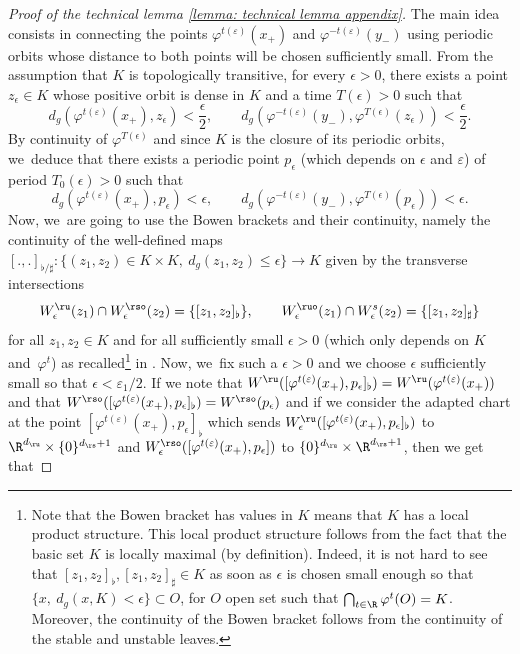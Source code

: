 \begin{appendix}
\begin{proof}[Proof of the technical lemma \ref{lemma: technical lemma appendix}]
The main idea consists in connecting the points $\varphi^{ t (\varepsilon)} (x_+)$ and $\varphi^{ - t (\varepsilon)} (y_-)$ using periodic orbits whose distance to both points will be chosen sufficiently small. From the assumption that $K$ is topologically transitive, for every $\epsilon > 0$, there exists a point $z_{\epsilon} \in K$ whose positive orbit is dense in $K$ and a time $T (\epsilon) > 0$ such that
\[
d_g (\varphi^{ t (\varepsilon)} (x_+), z_{\epsilon}) < \frac{\epsilon}{2}, \qquad d_g (\varphi^{- t (\varepsilon)} (y_-), \varphi^{T (\epsilon)} (z_{\epsilon})) < \frac{\epsilon}{2}.
\]
By continuity of $\varphi^{T (\epsilon)}$ and since $K$ is the closure of its periodic orbits, we~deduce that there exists a periodic point $p_{\epsilon}$ (which depends on $\epsilon$ and $\varepsilon$) of period $T_0 (\epsilon) > 0$ such that
\[
d_g (\varphi^{ t (\varepsilon)} (x_+), p_{\epsilon}) < \epsilon, \qquad d_g (\varphi^{- t (\varepsilon)} (y_-), \varphi^{T (\epsilon)} (p_{\epsilon})) < \epsilon.
\]
Now, we~are going to use the Bowen brackets and their continuity, namely the continuity of the well-defined maps $[.,.]_{\flat / \sharp}: \{ (z_1,z_2) \in K \times K, \: d_g (z_1,z_2) \leq \epsilon\} \to K$ given by the transverse intersections
\[
W_{\epsilon}^{\ru} (z_1) \cap W_{\epsilon}^{\rso} (z_2) = \{[z_1,z_2]_{\flat} \}, \qquad W_{\epsilon}^{\ruo} (z_1) \cap W_{\epsilon}^{s} (z_2) = \{[z_1,z_2]_{\sharp} \}
\]
for all $z_1,z_2 \in K$ and for all sufficiently small $\epsilon > 0$ (which only depends on $K$ and~$\varphi^t$) as recalled\footnote{Note that the Bowen bracket has values in $K$ means that $K$ has a local product structure. This local product structure follows from the fact that the basic set $K$ is locally maximal (by definition). Indeed, it is not hard to see that $[z_1,z_2]_{\flat}, [z_1,z_2]_{\sharp} \in K$ as soon as $\epsilon$ is chosen small enough so that $\{x, \: d_g (x,K) < \epsilon \} \subset O$, for $O$ open set such that $\bigcap_{t \in \R} \varphi^t (O) = K$. Moreover, the continuity of the Bowen bracket follows from the continuity of the stable and unstable leaves.} in \cite[Prop.\,6.2.2]{FH}. Now, we~fix such a $\epsilon > 0$ and we choose $\epsilon$ sufficiently small so that $\epsilon < \varepsilon_1 /2$. If we note that $ W^{\ru} ([\varphi^{t (\varepsilon)} (x_+),p_{\epsilon}]_{\flat}) = W^{\ru} (\varphi^{t (\varepsilon)} (x_+))$ and that $ W^{\rso} ([\varphi^{t (\varepsilon)} (x_+),p_{\epsilon}]_{\flat}) = W^{\rso} (p_{\epsilon}) $ and if we consider the adapted chart at the point $[\varphi^{t (\varepsilon)} (x_+),p_{\epsilon}]_{\flat}$ which sends $ W_{\epsilon}^{\ru} ([\varphi^{t (\varepsilon)} (x_+),p_{\epsilon}]_{\flat})$ to $\R^{d_{\ru}} \times \{0\}^{d_\rs + 1}$ and $ W_{\epsilon}^{\rso} ([\varphi^{t (\varepsilon)} (x_+),p_{\epsilon}]) $ to $\{0\}^{d_{\ru}} \times \R^{d_\rs+ 1}$, then we get that

\end{proof}
\end{appendix}
